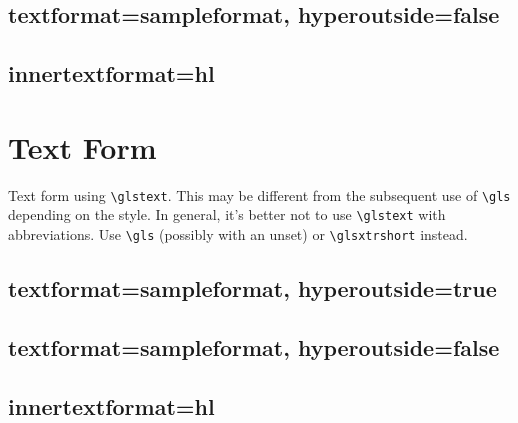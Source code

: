 \documentclass{report}
\begin{document}

\section{textformat=sampleformat, hyperoutside=false}


\section{innertextformat=hl}


\chapter{Text Form}
Text form using \verb|\glstext|. This may be different
from the subsequent use of \verb|\gls| depending on the style.
In general, it's better not to use \verb|\glstext| with
abbreviations. Use \verb|\gls| (possibly with an unset) 
or \verb|\glsxtrshort| instead.


\section{textformat=sampleformat, hyperoutside=true}


\section{textformat=sampleformat, hyperoutside=false}


\section{innertextformat=hl}
\end{document}
